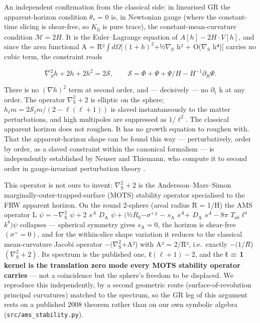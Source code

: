 \documentclass[12pt]{iopart}
\begin{document}
An independent confirmation from the classical side: in linearised GR
the apparent-horizon condition \(\theta\)₊ = 0 is, in Newtonian gauge
(where the constant-time slicing is shear-free, so \(K_{\mathrm{ij}}\)
is pure trace), the constant-mean-curvature condition
\(\mathcal{M}  = 2H\). It is the Euler--Lagrange equation of
\(A[h] - 2H\cdot V[h]\), and since the area functional A =
R̄²\(∫d\Omega [(1+h)^{2}\)+½\textbar{}\(\nabla _{\mathrm{S}}\) h\textbar²
+ O(\textbar{}\(\nabla _{\mathrm{S}}\) h\textbar⁴){]} carries no cubic
term, the constraint reads

\[\nabla_S^2 h + 2h + 2h^2 = 2\mathcal{S}, \qquad \mathcal{S} = \Phi + \Psi + \dot\Psi/H - H^{-1}\partial_R \Psi. \tag{2.9}\]

There is no \((\nabla h)^{2}\) term at second order, and --- decisively
--- no \(\partial _{\mathrm{t}}\) h at any order. The operator
\(\nabla ^{2}_{\mathrm{S}} + 2\) is elliptic on the sphere;
\(h_\ell m = 2\mathcal{S} _\ell m/(2 - \ell (\ell +1))\) is slaved
instantaneously to the matter perturbations, and high multipoles are
suppressed as \(1/\ell ^{2}\). The classical apparent horizon does not
roughen. It has no growth equation to roughen with. That the
apparent-horizon shape can be found this way --- perturbatively, order
by order, as a slaved constraint within the canonical formalism --- is
independently established by Neuser and Thiemann, who compute it to
second order in gauge-invariant perturbation theory
\citep{Neuser:2026unc}.

This operator is not ours to invent: \(\nabla ^{2}_{\mathrm{S}} + 2\) is
the Andersson--Mars--Simon marginally-outer-trapped-surface (MOTS)
stability operator \citep{Andersson:2007fh} specialised to the FRW
apparent horizon. On the round 2-sphere (areal radius R̄ = 1/H) the AMS
operator L \(\psi  = -\nabla ^{2}_{\mathrm{S}}\) \(\psi  + 2\) \(s^{A}\)
\(D_{\mathrm{A}}\)
\(\psi  + (\)½\(R_{\mathrm{S}}\)−\textbar{}\(\sigma ^{+}\)\textbar² −
\(s_{\mathrm{A}}\) \(s^{A}\)+ \(D_{\mathrm{A}}\) \(s^{A} - 8\pi\)
\(T_{ab}\ell ^{a}\) \(k^{b})\psi\) collapses --- spherical symmetry
gives \(s_{\mathrm{A}} = 0\), the horizon is shear-free
\((\sigma ^{+} = 0)\), and for the within-slice shape variation it
reduces to the classical mean-curvature Jacobi operator
\(-(\nabla ^{2}_{\mathrm{S}}\)+\textbar A\textbar²) with
\textbar A\textbar² = 2/R̄², i.e.~exactly
\(-(1/R\)̄)\((\nabla ^{2}_{\mathrm{S}} + 2)\). Its spectrum is the
published one, ℓ\((\ell +1) - 2\), and the \textbf{ℓ = 1 kernel is the
translation zero mode every MOTS stability operator carries} --- not a
coincidence but the sphere's freedom to be displaced. We reproduce this
independently, by a second geometric route (surface-of-revolution
principal curvatures) matched to the spectrum, so the GR leg of this
argument rests on a published 2008 theorem rather than on our own
symbolic algebra (\texttt{src/ams\_stability.py}).
\end{document}
